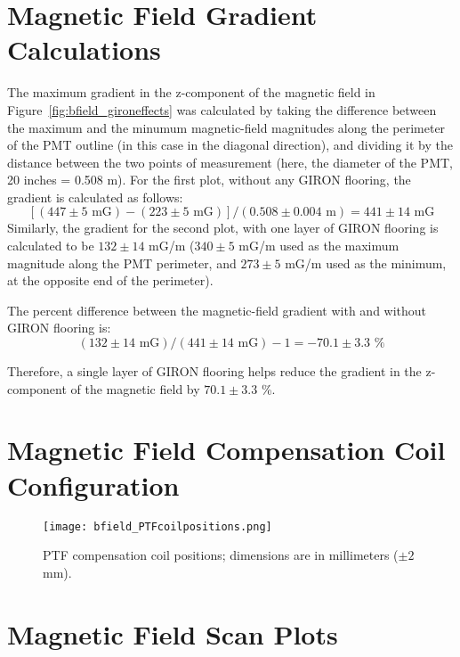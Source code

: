 \appendix

\section{Magnetic Field Gradient Calculations}
\label{Appendix:MagneticFieldGradientCalculations}

The maximum gradient in the z-component of the magnetic field in Figure~\ref{fig:bfield_gironeffects} was calculated by taking the difference between the maximum and the minumum magnetic-field magnitudes along the perimeter of the PMT outline (in this case in the diagonal direction), and dividing it by the distance between the two points of measurement (here, the diameter of the PMT, 20 inches = 0.508 m).
For the first plot, without any GIRON flooring, the gradient is calculated as follows:
\[[(447\pm5 \text{ mG}) - (223\pm5 \text{ mG})]/ (0.508\pm0.004 \text{ m} ) = 441\pm14 \text{ mG} \]
Similarly, the gradient for the second plot, with one layer of GIRON flooring is calculated to be $ 132\pm14 $ mG/m ($ 340\pm5 $ mG/m used as the maximum magnitude along the PMT perimeter, and $ 273\pm5 $ mG/m used as the minimum, at the opposite end of the perimeter).

The percent difference between the magnetic-field gradient with and without GIRON flooring is:
\[(132\pm14 \text{ mG})/(441\pm14 \text{ mG}) - 1 = -70.1\pm3.3 \text{ \%}\]

Therefore, a single layer of GIRON flooring helps reduce the gradient in the z-component of the magnetic field by $ 70.1\pm3.3 $ \%.

\newpage
\section{Magnetic Field Compensation Coil Configuration}
\label{Appendix:CoilPositions}
\begin{figure}[h!]
   \begin{center}
   \texttt{[image: bfield\_PTFcoilpositions.png]}
   \caption{PTF compensation coil positions; dimensions are in millimeters ($\pm2$ mm).}
   \label{fig:coilpos}
   \end{center}
\end{figure}

\newpage
\section{Magnetic Field Scan Plots}
\label{Appendix:MagneticFieldScanPlots}

